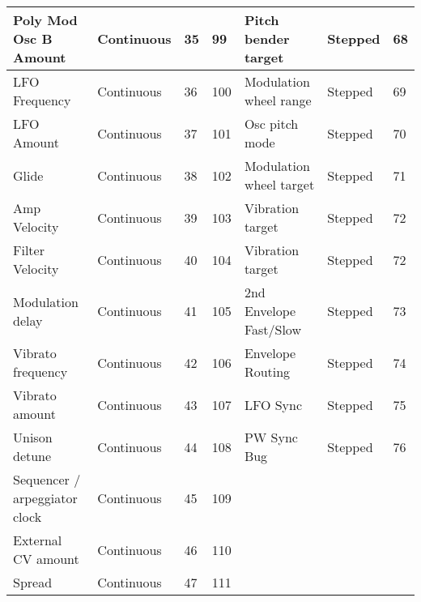 \begin{longtable}[l]{ p{5cm}|p{2cm}|p{1.5cm}|p{1.5cm}|p{5cm}|p{2cm}|p{1cm}}
Poly Mod Osc B Amount & Continuous & 35 & 99 & Pitch bender target & Stepped & 68 \\ \hline
LFO Frequency & Continuous & 36 & 100 & Modulation wheel range & Stepped & 69 \\ \hline
LFO Amount & Continuous & 37 & 101 & Osc pitch mode & Stepped & 70 \\ \hline
Glide & Continuous & 38 & 102 & Modulation wheel target & Stepped & 71 \\ \hline
Amp Velocity & Continuous & 39 & 103 & Vibration target & Stepped & 72 \\ \hline
Filter Velocity & Continuous & 40 & 104 & Vibration target & Stepped & 72 \\ \hline
Modulation delay & Continuous & 41 & 105 & 2nd Envelope Fast/Slow & Stepped & 73 \\ \hline
Vibrato frequency & Continuous & 42 & 106 & Envelope Routing & Stepped & 74 \\ \hline
Vibrato amount & Continuous & 43 & 107 & LFO Sync & Stepped & 75 \\ \hline
Unison detune & Continuous & 44 & 108 & PW Sync Bug & Stepped & 76 \\ \hline
Sequencer / arpeggiator clock & Continuous & 45 & 109 &  &  &  \\ \hline
External CV amount & Continuous & 46 & 110 &  &  &  \\ \hline
Spread & Continuous & 47 & 111 &  &  &  \\ \hline 
\end{longtable}

\normalsize
